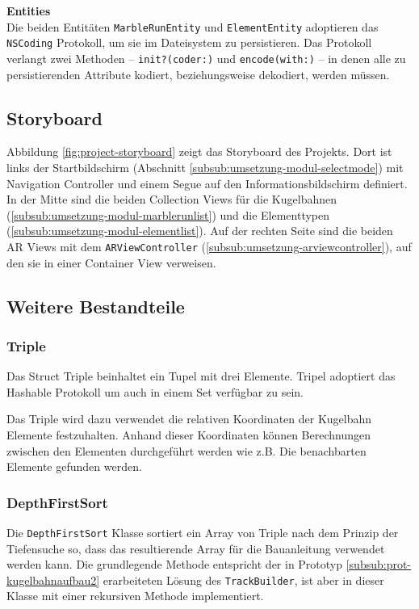 \textbf{Entities} \\
Die beiden Entitäten \texttt{MarbleRunEntity} und \texttt{ElementEntity} adoptieren das \texttt{NSCoding} Protokoll, um sie im Dateisystem zu persistieren.
Das Protokoll verlangt zwei Methoden – \texttt{init?(coder:)} und \texttt{encode(with:)} – in denen alle zu persistierenden Attribute kodiert, beziehungsweise dekodiert, werden müssen.


\subsection{Storyboard}


Abbildung \ref{fig:project-storyboard} zeigt das Storyboard des Projekts.
Dort ist links der Startbildschirm (Abschnitt \ref{subsub:umsetzung-modul-selectmode}) mit Navigation Controller und einem Segue auf den Informationsbildschirm definiert.
In der Mitte sind die beiden Collection Views für die Kugelbahnen (\ref{subsub:umsetzung-modul-marblerunlist}) und die Elementtypen (\ref{subsub:umsetzung-modul-elementlist}).
Auf der rechten Seite sind die beiden AR Views mit dem \texttt{ARViewController} (\ref{subsub:umsetzung-arviewcontroller}), auf den sie in einer Container View verweisen.


\subsection{Weitere Bestandteile}

\subsubsection{Triple} \label{subsub:umsetzung-triple}
Das Struct Triple beinhaltet ein Tupel mit drei Elemente. Tripel adoptiert das Hashable Protokoll um auch in einem Set verfügbar zu sein.

Das Triple wird dazu verwendet die relativen Koordinaten der Kugelbahn Elemente festzuhalten. Anhand dieser Koordinaten können Berechnungen zwischen den Elementen durchgeführt werden wie z.B. Die benachbarten Elemente gefunden werden.

\subsubsection{DepthFirstSort} \label{subsub:umsetzung-depthfirst}

Die \texttt{DepthFirstSort} Klasse sortiert ein Array von Triple nach dem Prinzip der Tiefensuche so, dass das resultierende Array für die Bauanleitung verwendet werden kann.
Die grundlegende Methode entspricht der in Prototyp \ref{subsub:prot-kugelbahnaufbau2} erarbeiteten Lösung des \texttt{TrackBuilder}, ist aber in dieser Klasse mit einer rekursiven Methode implementiert.

